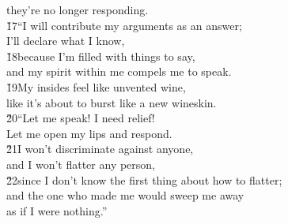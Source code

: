 \begin{poetry}
\poemlll       they're no longer responding. \\
\poeml \v{17}``I will contribute my arguments as an answer; \\
\poemll    I'll declare what I know, \\
\poeml \v{18}because I'm filled with things to say, \\
\poemll    and my spirit within me compels me to speak. \\
\poeml \v{19}My insides feel like unvented wine, \\
\poemll    like it's about to burst like a new wineskin. \\
\poeml \v{20}``Let me speak! I need relief! \\
\poemll    Let me open my lips and respond. \\
\poeml \v{21}I won't discriminate against anyone, \\
\poemll    and I won't flatter any person, \\
\poeml \v{22}since I don't know the first thing about how to flatter; \\
\poemll    and the one who made me would sweep me away \\
\poemlll       as if I were nothing.''
\end{poetry}

